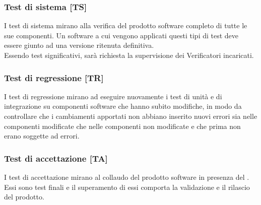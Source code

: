 \subsubsection{Test di sistema [TS]}
I test di sistema mirano alla verifica del prodotto software completo di tutte le sue componenti. Un software a cui vengono applicati questi tipi di test deve essere giunto ad una versione ritenuta definitiva. \\
Essendo test significativi, sarà richiesta la supervisione dei Verificatori incaricati.
\subsubsection{Test di regressione [TR]}
I test di regressione mirano ad eseguire nuovamente i test di unità e di integrazione su componenti software che hanno subito modifiche, in modo da controllare che i cambiamenti apportati non abbiano inserito nuovi errori sia nelle componenti modificate che nelle componenti non modificate e che prima non erano soggette ad errori.
\subsubsection{Test di accettazione [TA]}
I test di accettazione mirano al collaudo del prodotto software in presenza del . Essi sono test finali e il superamento di essi comporta la validazione e il rilascio del prodotto.
\pagebreak